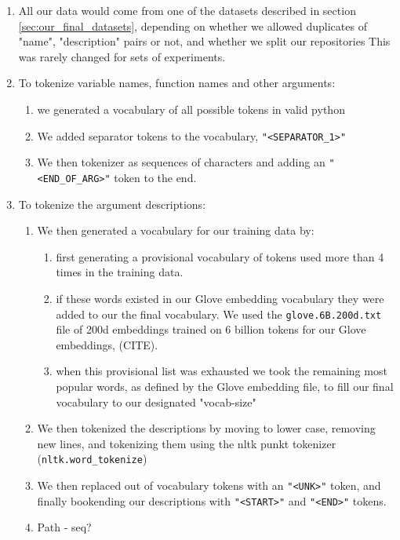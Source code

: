 \begin{enumerate}
    \item All our data would come from one of the datasets described in section \ref{sec:our_final_datasets}, depending on whether we allowed duplicates of "name", "description" pairs or not, and whether we split our repositories
    This was rarely changed for sets of experiments. 

    \item To tokenize variable names, function names and other arguments:
    \begin{enumerate}
        \item we generated a vocabulary of all possible tokens in valid python
        \item We added separator tokens to the vocabulary, \texttt{"<SEPARATOR_1>"}
        \item We then tokenizer as sequences of characters and adding an \texttt{"<END_OF_ARG>"} token to the end.
    \end{enumerate}
    
    \item To tokenize the argument descriptions:
    \begin{enumerate}
        \item We then generated a vocabulary for our training data by:
        \begin{enumerate}
            \item first generating a provisional vocabulary of tokens used more than 4 times in the training data.
            \item if these words existed in our Glove embedding vocabulary they were added to our the final vocabulary. We used the  \texttt{glove.6B.200d.txt} file of 200d embeddings trained on 6 billion tokens for our Glove embeddings, (CITE). 
            \item when this provisional list was exhausted we took the remaining most popular words, as defined by the Glove embedding file, to fill our final vocabulary to our designated "vocab-size"
        \end{enumerate}
        \item We then tokenized the descriptions by moving to lower case, removing new lines, and  tokenizing them using the nltk punkt tokenizer (\texttt{nltk.word_tokenize})
        \item We then replaced out of vocabulary tokens with an \texttt{"<UNK>"} token, and finally bookending our descriptions with \texttt{"<START>"} and \texttt{"<END>"} tokens.
        \item Path - seq?


\end{enumerate}
\end{enumerate}
